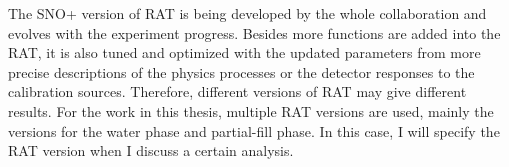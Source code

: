 The SNO+ version of RAT is being developed by the whole collaboration and evolves with the experiment progress.
Besides more functions are added into the RAT, it is also tuned and optimized with the updated parameters from more precise descriptions of the physics processes or the detector responses to the calibration sources. Therefore, different versions of RAT may give different results. For the work in this thesis, multiple RAT versions are used, mainly the versions for the water phase and partial-fill phase. In this case, I will specify the RAT version when I discuss a certain analysis.
\cite{ratManual}